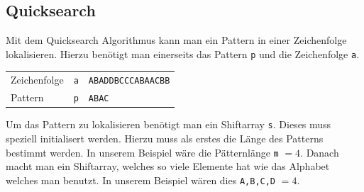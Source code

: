 




\newpage
\subsection{Quicksearch}

Mit dem Quicksearch Algorithmus kann man ein Pattern in einer 
Zeichenfolge lokalisieren. Hierzu benötigt man einerseits das
Pattern \verb!p! und die Zeichenfolge \verb!a!.

\begin{table}[h!]
	\centering
	\begin{tabular}{l c l}
		Zeichenfolge
			& \verb!a!
			& \verb!ABADDBCCCABAACBB! \\
		Pattern
			& \verb!p!
			& \verb!ABAC! \\
	\end{tabular}
\end{table}

\noindent
Um das Pattern zu lokalisieren benötigt man ein Shiftarray \verb!s!.
Dieses muss speziell initialisert werden. Hierzu muss als erstes die 
Länge des Patterns bestimmt werden. In unserem Beispiel wäre die
Pätternlänge \verb!m! $=4$. Danach macht man ein Shiftarray, welches
so viele Elemente hat wie das Alphabet welches man benutzt. In unserem
Beispiel wären dies \verb!A,B,C,D! $=4$.

